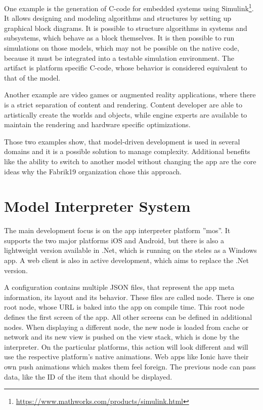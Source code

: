 One example is the generation of C-code for embedded systems using Simulink\footnote{\url{https://www.mathworks.com/products/simulink.html}}.
It allows designing and modeling algorithms and structures by setting up graphical block diagrams.
It is possible to structure algorithms in systems and subsystems, which behave as a block themselves.
It is then possible to run simulations on those models, which may not be possible on the native code, because it must be integrated into a testable simulation environment.
The artifact is platform specific C-code, whose behavior is considered equivalent to that of the model.

Another example are video games or augmented reality applications, where there is a strict separation of content and rendering.
Content developer are able to artistically create the worlds and objects, while engine experts are available to maintain the rendering and hardware specific optimizations.

Those two examples show, that model-driven development is used in several domains and it is a possible solution to manage complexity.
Additional benefits like the ability to switch to another model without changing the app are the core ideas why the Fabrik19 organization chose this approach.

\section{Model Interpreter System}

The main development focus is on the app interpreter platform ''mos''.
It supports the two major platforms iOS and Android, but there is also a lightweight version available in .Net, which is running on the steles as a Windows app.
A web client is also in active development, which aims to replace the .Net version.

A configuration contains multiple JSON files, that represent the app meta information, its layout and its behavior.
These files are called node.
There is one root node, whose \ac{URL} is baked into the app on compile time.
This root node defines the first screen of the app.
All other screens can be defined in additional nodes.
When displaying a different node, the new node is loaded from cache or network and its new view is pushed on the view stack, which is done by the interpreter.
On the particular platforms, this action will look different and will use the respective platform's native animations.
Web apps like Ionic have their own push animations which makes them feel foreign.
The previous node can pass data, like the ID of the item that should be displayed.

